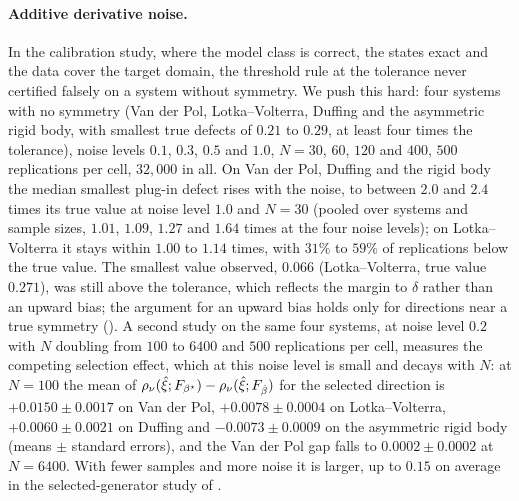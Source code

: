 \paragraph{Additive derivative noise.} In the calibration study, where the
model class is correct, the states exact and the data cover the target domain,
the threshold rule at the tolerance never certified falsely on a system without
symmetry. We push this hard: four systems with no symmetry (Van der Pol,
Lotka--Volterra, Duffing and the asymmetric rigid body, with smallest true
defects of $0.21$ to $0.29$, at least four times the tolerance), noise levels
$0.1$, $0.3$, $0.5$ and $1.0$, $N = 30$, $60$, $120$ and $400$, $500$
replications per cell, $32{,}000$ in all. On Van der Pol, Duffing and the rigid
body the median smallest plug-in defect rises with the noise, to between $2.0$
and $2.4$ times its true value at noise level $1.0$ and $N = 30$ (pooled over
systems and sample sizes, $1.01$, $1.09$, $1.27$ and $1.64$ times at the four
noise levels); on Lotka--Volterra it stays within $1.00$ to $1.14$ times, with
$31\%$ to $59\%$ of replications below the true value. The smallest value
observed, $0.066$ (Lotka--Volterra, true value $0.271$), was still above the
tolerance, which reflects the margin to $\delta$ rather than an upward bias;
the argument for an upward bias holds only for directions near a true
symmetry (). A
second study on the same four systems, at noise level $0.2$ with $N$ doubling
from $100$ to $6400$ and $500$ replications per cell, measures the competing
selection effect, which at this noise level is small and decays with $N$: at
$N=100$ the mean of $\rho_\nu(\hat\xi;F_{\beta^\star}) -
\rho_\nu(\hat\xi;F_{\hat{\beta}})$ for the selected direction is $+0.0150 \pm
0.0017$ on Van der Pol, $+0.0078 \pm 0.0004$ on Lotka--Volterra, $+0.0060 \pm
0.0021$ on Duffing and $-0.0073 \pm 0.0009$ on the asymmetric rigid body (means
$\pm$ standard errors), and the Van der Pol gap falls to $0.0002 \pm 0.0002$ at
$N = 6400$. With fewer samples and more noise it is larger, up to $0.15$ on
average in the selected-generator study of .

